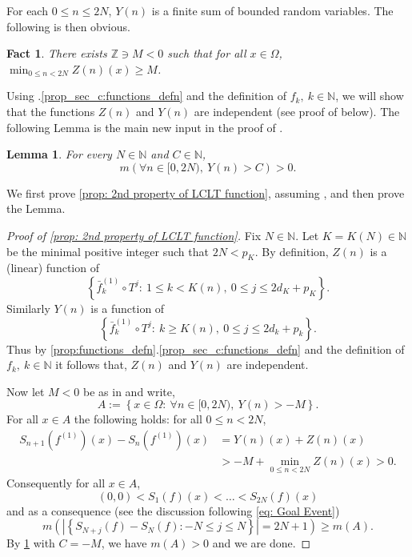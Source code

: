 \documentclass[12pt,reqno]{amsart}
\newcommand{\N}{\mathbb{N}}
\newcommand{\Z}{\mathbb{Z}}
\newtheorem{lemma}[thm]{Lemma}
\newtheorem{fact}[thm]{Fact}
\theoremstyle{definition}
\begin{document}
For each $0\leq n\leq 2N$, $Y(n)$ is a finite sum of bounded random variables. The following is then obvious. 

\begin{fact}\label{fact: Z does not matter}
There exists $\Z\ni M<0$ such that for all $x\in \Omega$, $\min_{0\leq n< 2N}Z(n)(x)\geq M$. 
\end{fact}

Using .\ref{prop_sec_c:functions_defn} and the definition of $f_k,\ k\in\N$, we will show that the functions $Z(n)$ and $Y(n)$ are independent (see proof of  below). The following Lemma is the main new input in the proof of . 

\begin{lemma}\label{lem: main new input in LCLT}
For every $N\in\N$ and $C\in\N$, 
\[
m\left(\forall n\in[0,2N),\ Y(n)>C\right)>0. 
\]
\end{lemma}
We first prove \cref{prop: 2nd property of LCLT function}, assuming , and then prove the Lemma. 
\begin{proof}[Proof of \cref{prop: 2nd property of LCLT function}]
Fix $N\in \N$. Let $K=K(N)\in\N$ be the minimal positive integer such that $2N<p_K$. By definition, $Z(n)$ is a (linear) function of 
\[
\left\{\bar{f}^{(1)}_k\circ T^j:\ 1\leq k< K(n), \  0\leq j\leq 2d_K+p_K\right\}.
\]
Similarly $Y(n)$ is a function of 
\[
\left\{\bar{f}^{(1)}_k\circ T^j:\ k\geq K(n), \  0\leq j\leq 2d_k+p_k\right\}.
\]
Thus by \cref{prop:functions_defn}.\ref{prop_sec_c:functions_defn} and the definition of $f_k,\ k\in\N$ it follows that, $Z(n)$ and $Y(n)$ are independent. 

Now let $M<0$ be as in  and write,
\[
A:=\left\{x\in \Omega:\ \forall n\in[0,2N),\ Y(n)>-M\right\}. 
\]
For all $x\in A$ the following holds: for all $0\leq n <2N$,
\begin{align*}
S_{n+1}\left(f^{(1)}\right)(x)-S_n\left(f^{(1)}\right)(x)&=Y(n)(x)+Z(n)(x)\\
&> -M+\min_{0\leq n<2N}Z(n)(x)> 0. 
\end{align*}
Consequently for all $x\in A$, 
\[
(0,0)< S_1(f)(x)<\ldots <S_{2N}(f)(x)
\]
and as a consequence (see the discussion following \eqref{eq: Goal Event})
\[
m\left(\left|\left\{S_{N+j}(f)-S_N(f):-N\leq j\leq N\right\}\right|=2N+1\right)\geq m(A).
\]
By \cref{lem: main new input in LCLT} with $C = -M$, we have $m(A)>0$ and we are done. 
\end{proof}
\end{document}
